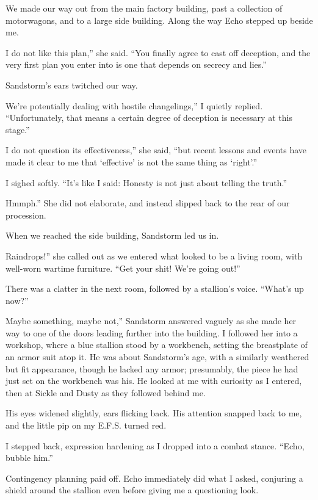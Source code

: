 We made our way out from the main factory building, past a collection of motorwagons, and to a large side building. Along the way Echo stepped up beside me.

\leavevmode{}I do not like this plan,” she said. “You finally agree to cast off deception, and the very first plan you enter into is one that depends on secrecy and lies.”

Sandstorm’s ears twitched our way.

\leavevmode{}We’re potentially dealing with hostile changelings,” I quietly replied. “Unfortunately, that means a certain degree of deception is necessary at this stage.”

\leavevmode{}I do not question its effectiveness,” she said, “but recent lessons and events have made it clear to me that ‘effective’ is not the same thing as ‘right’.”

I sighed softly. “It’s like I said: Honesty is not just about telling the truth.”

\leavevmode{}Hmmph.” She did not elaborate, and instead slipped back to the rear of our procession.

When we reached the side building, Sandstorm led us in.

\leavevmode{}Raindrops!” she called out as we entered what looked to be a living room, with well-worn wartime furniture. “Get your shit! We’re going out!”

There was a clatter in the next room, followed by a stallion’s voice. “What’s up now?”

\leavevmode{}Maybe something, maybe not,” Sandstorm answered vaguely as she made her way to one of the doors leading further into the building. I followed her into a workshop, where a blue stallion stood by a workbench, setting the breastplate of an armor suit atop it. He was about Sandstorm’s age, with a similarly weathered but fit appearance, though he lacked any armor; presumably, the piece he had just set on the workbench was his. He looked at me with curiosity as I entered, then at Sickle and Dusty as they followed behind me.

His eyes widened slightly, ears flicking back. His attention snapped back to me, and the little pip on my E.F.S. turned red.

I stepped back, expression hardening as I dropped into a combat stance. “Echo, bubble him.”

Contingency planning paid off. Echo immediately did what I asked, conjuring a shield around the stallion even before giving me a questioning look.


